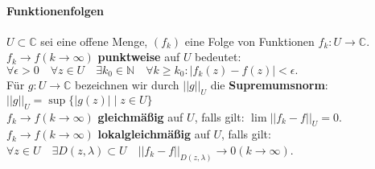 \documentclass[a4paper, 10pt, DIV20, headings=small]{scrartcl}
\theoremstyle{definition}
\theoremstyle{plain}
\begin{document}
\paragraph{Funktionenfolgen}
$U \subset \mathbb{C}$ sei eine offene Menge, $(f_k)$ eine Folge von Funktionen $f_k : U \to \mathbb{C}$. \\
$f_k \rightarrow f (k \rightarrow \infty)$ \textbf{punktweise} auf $U$ bedeutet:
$\forall \epsilon > 0 \quad \forall z \in U \quad \exists k_0 \in \mathbb{N} \quad \forall k \geq k_0 \colon |f_k (z) - f (z)| < \epsilon.$
\\
Für $g \colon U \to \mathbb{C}$ bezeichnen wir durch $||g||_U$ die \textbf{Supremumsnorm}: $||g||_U = \sup \{|g(z)| \mid z \in U \}$
\\
$f_k \rightarrow f (k \rightarrow \infty)$ \textbf{gleichmäßig} auf $U$, falls gilt: $\lim ||f_k - f||_U = 0$.
\\
$f_k \rightarrow f (k \rightarrow \infty)$ \textbf{lokalgleichmäßig} auf $U$, falls gilt: $\forall z \in U \quad \exists D(z, \lambda) \subset U \quad ||f_k- f ||_{D(z,\lambda)} \rightarrow 0 (k \rightarrow \infty)$.
\end{document}
